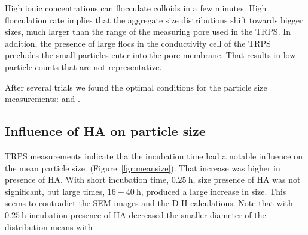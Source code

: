 \documentclass[journal=langd5,manuscript=article]{achemso}
\begin{document}
High ionic concentrations can flocculate colloids in a few minutes. High flocculation rate implies that the aggregate size distributions shift towards bigger sizes, much larger than the range of the measuring pore used in the TRPS. In addition, the presence of large flocs in the conductivity cell of the TRPS precludes the small particles enter into the pore membrane. That results in low particle counts that are not representative.

After several trials we found the optimal conditions for the particle size measurements:   and .







\subsection{Influence of HA on particle size}

TRPS measurements indicate 
tha the incubation time had a notable influence on the mean particle size.
(Figure~\ref{fgr:meansize}).
That increase was higher in presence of HA.
With short incubation time,
$0.25~\mathrm{h}$,
size presence of HA was not significant, but large times, $16 - 40~\mathrm{h}$, produced a large increase in size. This seems to contradict the SEM images and the D-H calculations.
Note that with 
$0.25~\mathrm{h}$
incubation
presence of HA decreased the smaller diameter of the distribution  means with 
\end{document}
